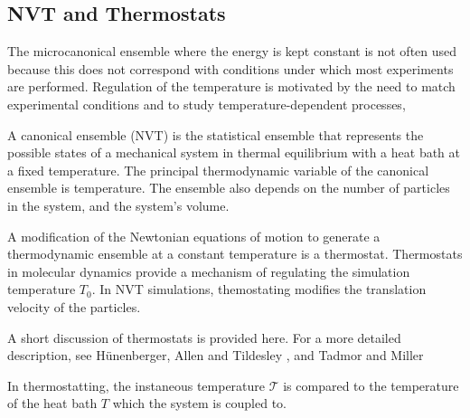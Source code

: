 \subsection{NVT and Thermostats}
\label{sec:nvt_ensemble}
The microcanonical ensemble where the energy is kept constant is not often used because this does not correspond with conditions under which most experiments are performed.  Regulation of the temperature is motivated by the need to match experimental conditions and to study temperature-dependent processes,

A canonical ensemble (NVT) is the statistical ensemble that represents the possible states of a mechanical system in thermal equilibrium with a heat bath at a fixed temperature.  The principal thermodynamic variable of the canonical ensemble is temperature.  The ensemble also depends on the number of particles in the system, and the system's volume.

A modification of the Newtonian equations of motion to generate a thermodynamic ensemble at a constant temperature is a thermostat.  Thermostats in molecular dynamics provide a mechanism of regulating the simulation temperature $T_0$.  In NVT simulations, themostating modifies the translation velocity of the particles.

A short discussion of thermostats is provided here.  For a more detailed description, see H\"{u}nenberger\cite{hunenberger2005_thermostat}, Allen and Tildesley \cite{allen1987_md}, and Tadmor and Miller \cite{tadmor2011_md}

In thermostatting, the instaneous temperature $\mathcal{T}$ is compared to the temperature of the heat bath $T$ which the system is coupled to.

